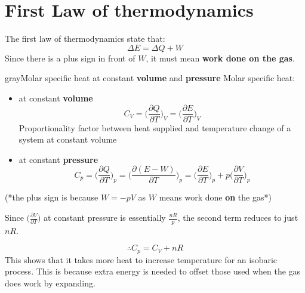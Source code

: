 \documentclass[12pt,a4paper]{extreport}
\numberwithin{equation}{chapter}
\begin{document}
    \section{First Law of thermodynamics}
        The first law of thermodynamics state that: 
        \begin{equation}
            \Delta E= \Delta Q + W
        \end{equation}
        Since there is a plus sign in front of $W$, it must mean \textbf{work done on the gas}.
         \begin{mybox}{gray}{Molar specific heat at constant \textbf{volume} and \textbf{pressure}}
            Molar specific heat: 
            \begin{itemize}
                \item at constant \textbf{volume}
                    \begin{equation}
                        C_V=\bigg(\frac{\partial Q}{\partial T}\bigg)_V=\bigg(\frac{\partial E}{\partial T}\bigg)_V
                    \end{equation}
                    Proportionality factor between heat supplied and temperature change of a system at constant volume
                \item at constant \textbf{pressure}
                    \begin{equation}
                        C_p
                        =\bigg(\frac{\partial Q}{\partial T}\bigg)_p
                        =\bigg(\frac{\partial (E-W)}{\partial T}\bigg)_p
                        =\bigg(\frac{\partial E}{\partial T}\bigg)_p+
                        p\bigg(\frac{\partial V}{\partial T}\bigg)_p
                    \end{equation}
            \end{itemize}
            (*the plus sign is because $W=-pV$ as $W$ means work done \textbf{on} the gas*)
            \begin{flushleft}
                Since $\big(\frac{\partial V}{\partial T}\big)$ at constant pressure is essentially $\frac{nR}{p}$, the second term reduces to just $nR$.
            \end{flushleft}
    
            $$\boxed{\therefore C_p=C_V+nR}$$
            This shows that it takes more heat to increase temperature for an isobaric process. This is because extra energy is needed to offset those used when the gas does work by expanding.
        
         \end{mybox}
\end{document}
